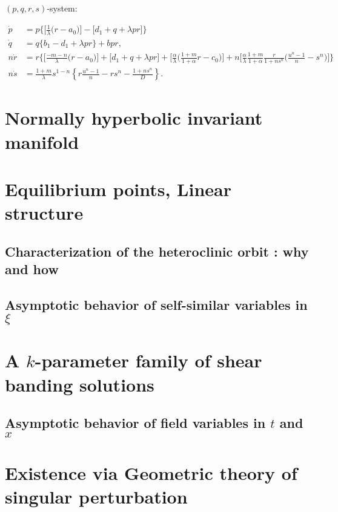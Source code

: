 \documentclass[a4paper,11pt]{article}
\def\dpp{\dot{p}}
\def\dqq{\dot{q}}
\def\drr{\dot{r}}
\begin{document}
$(p,q,r,s)$-system:

\begin{equation}
\begin{aligned}
  {\dpp}&=p\bigg\{\Big[\frac{1}{\lambda }\Big(r-a_0\Big)\Big] -\Big[d_1 + q + \lambda p r\Big]\bigg\}\\
  {\dqq}&=q\bigg\{b_1-d_1 + \lambda p r\bigg\} +bpr,\\
 n{\drr}&=r\bigg\{\Big[\frac{-m-n}{\lambda }\Big(r-a_0\Big)\Big]+\Big[d_1 + q + \lambda p r\Big]+\Big[\frac{\alpha}{\lambda }\Big(\frac{1+m}{1+\alpha}r-c_0\Big)\Big] + n\Big[\frac{\alpha}{\lambda }\frac{1+m}{1+\alpha} \frac{r}{1+ns^n}\Big(\frac{u^n-1}{n}-s^n\Big)\Big]\bigg\}\\
 n\dot{s}&=\frac{1+m}{\lambda}s^{1-n} \left\{r\frac{u^n-1}{n} - rs^n -\frac{1+ns^n}{D}\right\}.
\end{aligned}
\end{equation}

\section{Normally hyperbolic invariant manifold}
\section{Equilibrium points, Linear structure}
\subsection{Characterization of the heteroclinic orbit : why and how}
\subsection{Asymptotic behavior of self-similar variables in $\xi$}
\section{A $k$-parameter family of shear banding solutions}
\subsection{Asymptotic behavior of field variables in $t$ and $x$}
\section{Existence via Geometric theory of singular perturbation}
\end{document}

